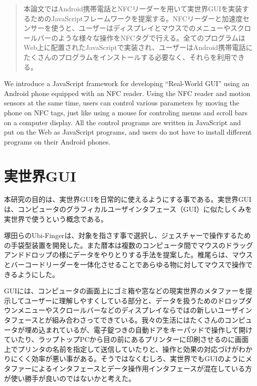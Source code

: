 
\begin{abstract}
本論文ではAndroid携帯電話とNFCリーダーを用いて実世界GUIを実装するためのJavaScriptフレームワークを提案する。NFCリーダーと加速度センサーを使うと、ユーザーはディスプレイとマウスでのメニューやスクロールバーのような様々な操作をNFCタグで行える。全てのプログラムはWeb上に配置されたJavaScriptで実装され、ユーザーはAndroid携帯電話にたくさんのプログラムをインストールする必要なく、それらを利用できる。
\end{abstract}

\begin{eabstract}
We introduce a JavaScript framework for developing ``Real-World GUI'' using an Android phone equipped with an NFC reader.  Using the NFC reader and motion sensors at the same time, users can control various parameters by moving the phone on NFC tags, just like using a mouse for controling menus and scroll bars on a computer display.  All the control programs are written in JavaScript and put on the Web as JavaScript programs, and users do not have to install different programs on their Android phones. 
\end{eabstract}

\maketitle

\section{実世界GUI}\label{sec:Introduction}
本研究の目的は、実世界GUI\cite{実世界GUI}を日常的に使えるようにする事である。実世界GUIは、コンピュータのグラフィカルユーザインタフェース（GUI）に似たしくみを実世界で使うという概念である。

塚田らのUbi-Finger\cite{Ubi-Finger}は、対象を指さす事で選択し、ジェスチャーで操作するための手袋型装置を開発した。また暦本は複数のコンピュータ間でマウスのドラッグアンドドロップの様にデータをやりとりする手法\cite{pick-and-drop}を提案した。椎尾らは、マウスとバーコードリーダーを一体化させることであらゆる物に対してマウスで操作できるようにした。\cite{field-mouse}

GUIには、コンピュータの画面上にゴミ箱や窓などの現実世界のメタファーを提示してユーザーに理解しやすくしている部分と、データを扱うためのドロップダウンメニューやスクロールバーなどのディスプレイならではの新しいユーザインタフェースとが組み合わさってできている。我々の生活にはたくさんのコンピュータが埋め込まれているが、電子錠つきの自動ドアをキーパッドで操作して開けていたり、ラップトップPCから目の前にあるプリンターに印刷させるのに画面上でプリンタの名前を指定して送信していたりと、操作と効果の対応づけがわかりにくく効率が悪い事がある。そうではなくむしろ、実世界でもGUIのようにメタファーによるインタフェースとデータ操作用インタフェースが混在している方が使い勝手が良いのではないかと考えた。

